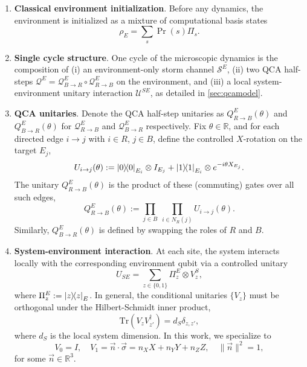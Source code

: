 \documentclass[
    aps,
    prx,
    reprint,
    superscriptaddress,
    longbibliography,
    nofootinbib,
    floatfix,
]{revtex4-2}
\newcommand{\Tr}{\mathrm{Tr}}
\newcommand{\ketbra}[2]{\ket{#1}\!\!\bra{#2}}  %
\begin{document}
\begin{enumerate}
    \item[(I)] \textbf{Classical environment initialization}. Before any dynamics, the environment is initialized as a mixture of computational basis states
    \begin{equation}\label{eq:initial_rho_env}
        \rho_E = \sum_s \Pr(s) \Pi_s.
    \end{equation}

    \item[(II)] \textbf{Single cycle structure}. One cycle of the microscopic dynamics is the composition of (i) an environment-only storm channel \(\mathcal{S}^E\), (ii) two QCA half-steps \(\mathcal{Q}^E = \mathcal{Q}_{B\to R}^E \circ \mathcal{Q}_{R\to B}^E\) on the environment, and (iii) a local system-environment unitary interaction \(\mathcal{U}^{SE}\), as detailed in \cref{sec:qcamodel}.
    
    \item[(III)] \textbf{QCA unitaries}. Denote the QCA half-step unitaries as \(Q_{R\to B}^E(\theta)\) and \(Q_{B\to R}^E(\theta)\) for \(\mathcal{Q}_{R\to B}^E\) and \(\mathcal{Q}_{B\to R}^E\) respectively. Fix \(\theta \in \mathbb{R}\), and for each directed edge \(i \to j\) with \(i \in R\), \(j \in B\), define the controlled \(X\)-rotation on the target \(E_j\),
    \begin{equation}
        U_{i\to j}(\theta):=\ketbra{0}{0}_{E_i}\otimes I_{E_j}+\ketbra{1}{1}_{E_i}\otimes e^{-i\theta X_{E_j}}.
    \end{equation}
    The unitary \(Q^{E}_{R \to B}(\theta)\) is the product of these (commuting) gates over all such edges,
    \begin{equation}
        Q^{E}_{R\to B}(\theta):=\prod_{j\in B}\ \prod_{i\in N_R(j)} U_{i\to j}(\theta).
    \end{equation}
    Similarly, \(Q^{E}_{B\to R}(\theta)\) is defined by swapping the roles of \(R\) and \(B\).

    \item[(IV)] \textbf{System-environment interaction}.
    At each site, the system interacts locally with the corresponding environment qubit via a controlled unitary
    \begin{equation}\label{eq:se-unitary}
        U_{SE}=\sum_{z\in\{0,1\}}\Pi_z^E\otimes V_z^S,
    \end{equation}
    where \(\Pi^{E}_{z}:=\ketbra{z}{z}_E\). In general, the conditional unitaries \(\{V_z\}\) must be orthogonal under the Hilbert-Schmidt inner product,
    \begin{equation}\label{eq:hs-orthogonal}
        \Tr(V_zV_{z'}^\dagger) = d_S \delta_{z,z'},
    \end{equation}
    where \(d_S\) is the local system dimension. In this work, we specialize to
    \begin{equation}\label{eq:unitary-decomp}
        V_0 = I, \quad V_1 = \vec{n} \cdot \vec{\sigma} = n_X X + n_Y Y + n_Z Z, \quad \|\vec{n}\|^2 = 1,
    \end{equation}
    for some \(\vec{n} \in \mathbb{R}^3\).


\end{enumerate}
\end{document}
